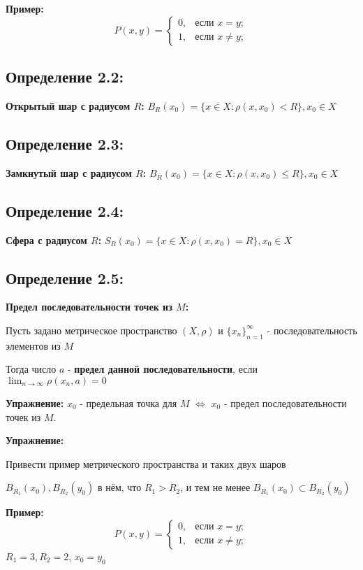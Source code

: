 \documentclass[12pt]{article}
\begin{document}
\textbf{Пример:}
	$$
P(x,y) = \begin{cases}
   0, &\text{если } x = y; \\
   1, &\text{если } x \neq y;
\end{cases}
$$	
	
\subsection*{Определение 2.2:}
	\textbf{Открытый шар с радиусом $R$:}
	$B_R(x_0) = \{{x \in X : \rho(x,x_0) < R}\} , x_0 \in X$
	
\subsection*{Определение 2.3:}
	\textbf{Замкнутый шар с радиусом $R$:}
	$B_{\bar{R}}(x_0) = \{{x \in X : \rho(x,x_0) \leq R}\} , x_0 \in X$

\subsection*{Определение 2.4:}
	\textbf{Сфера с радиусом $R$:}
	$S_R(x_0) = \{{x \in X : \rho(x,x_0) = R}\} , x_0 \in X$

\subsection*{Определение 2.5:}
	\textbf{Предел последовательности точек из $M$:}
	
	Пусть задано метрическое пространство $(X,\rho)$ и $\{{x_n}\}_{n = 1}^{\infty}$ - последовательность элементов из $M$
	
	Тогда число $a$ - \textbf{предел данной последовательности}, если $\lim_{n \to \infty} \rho(x_n , a) = 0$
	
	
\textbf{Упражнение:}
	$x_0$ - предельная точка для $M$ $\Leftrightarrow$ $x_0$ - предел последовательности точек из $M$.

\textbf{Упражнение:}

	Привести пример метрического пространства и таких двух шаров 
	
	$B_{R_1}(x_0),B_{R_2}(y_0)$ в нём, что $R_1 > R_2$, и тем не менее $ B_{R_1}(x_0) \subset B_{R_2}(y_0) $

\textbf{Пример:}
	$$
P(x,y) = \begin{cases}
   0, &\text{если } x = y; \\
   1, &\text{если } x \neq y;
\end{cases}
$$	
	$R_1 = 3 , R_2 = 2$, $x_0 = y_0$
\end{document}
